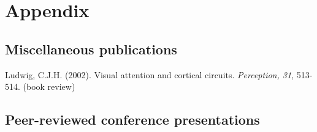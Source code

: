 \documentclass[a4paper, 10pt]{article}
\renewenvironment{itemize}{
  \begin{list}{}{
    \setlength{\leftmargin}{1.5em}
  }
}{
  \end{list}
}
\begin{document}
\newpage
\appendix

\section*{Appendix}

\subsection*{Miscellaneous publications}
\begin{itemize}
\item Ludwig, C.J.H. (2002). Visual attention and cortical circuits. {\it Perception, 31}, 513-514. (book review)
\end{itemize}

\subsection*{Peer-reviewed conference presentations}
\end{document}
